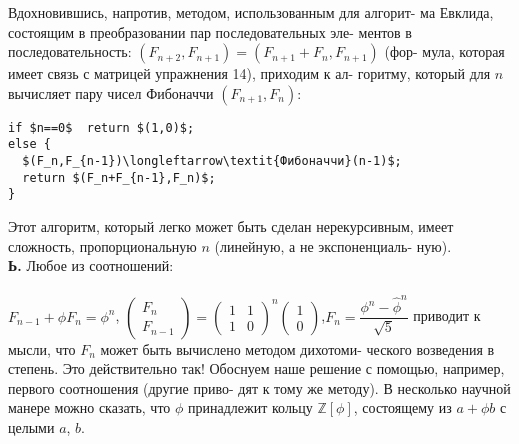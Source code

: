 Вдохновившись, напротив, методом, использованным для алгорит-\linebreak
ма Евклида, состоящим в преобразовании пар последовательных эле-\linebreak
ментов в последовательность: $(F_{n+2},F_{n+1})=(F_{n+1}+F_n,F_{n+1})$ (фор-\linebreak
мула, которая имеет связь с матрицей упражнения 14), приходим к ал-\linebreak
горитму, который для $n$ вычисляет пару чисел Фибоначчи $(F_{n+1},F_n)$:
\begin{lstlisting}[xleftmargin=15pt, mathescape=true]
if $n==0$  return $(1,0)$;
else {
  $(F_n,F_{n-1})\longleftarrow\textit{Фибоначчи}(n-1)$;
  return $(F_n+F_{n-1},F_n)$;
}
\end{lstlisting}
\hspace*{15pt}Этот алгоритм, который легко может быть сделан нерекурсивным,\linebreak
имеет сложность, пропорциональную $n$ (линейную, а не экспоненциаль-\linebreak
ную).\\
\hspace*{15pt}\textbf{Ь.} Любое из соотношений:\\\\
\hspace*{5pt}$F_{n-1}+\phi F_n=\phi^n$,\hspace{40pt}
$\begin{pmatrix}
F_n \\ F_{n-1}
\end{pmatrix}=
\begin{pmatrix}
1 & 1 \\ 1 & 0
\end{pmatrix}^n
\begin{pmatrix}
1 \\ 0
\end{pmatrix}$,\hspace{40pt}$F_n=\dfrac{\phi^n-\hat{\phi}^n}{\sqrt{5}}$\newline
приводит к мысли, что $F_n$ может быть вычислено методом дихотоми-\linebreak
ческого возведения в степень. Это действительно так! Обоснуем наше\linebreak
решение с помощью, например, первого соотношения (другие приво-\linebreak
дят к тому же методу). В несколько научной манере можно сказать,\linebreak
что $\phi$ принадлежит кольцу $\mathbb{Z}[\phi]$, состоящему из $a+\phi b$ с целыми $a$, $b$.\linebreak
